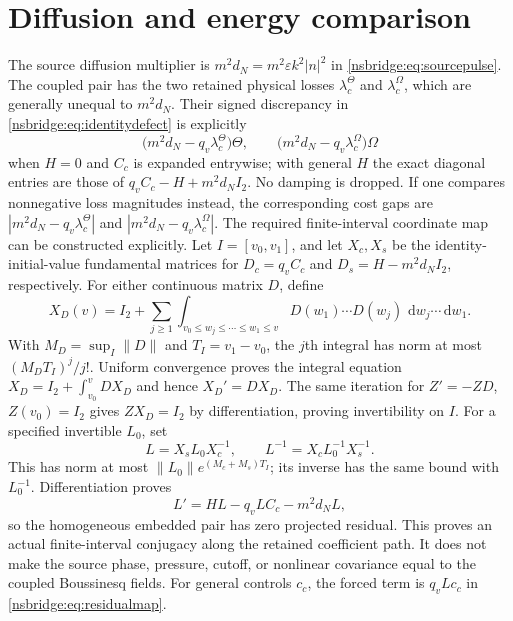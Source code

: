 \documentclass[11pt]{article}
\newcommand{\dd}{\,\mathrm d}
\begin{document}
\section{Diffusion and energy comparison}
The source diffusion multiplier is $m^2d_N=m^2\varepsilon k^2|n|^2$ in
\eqref{nsbridge:eq:sourcepulse}.  The coupled pair has the two retained physical losses
$\lambda_c^\Theta$ and $\lambda_c^\Omega$, which are generally unequal to
$m^2d_N$.  Their signed discrepancy in \eqref{nsbridge:eq:identitydefect} is explicitly
\begin{equation}
 \bigl(m^2d_N-q_v\lambda_c^\Theta\bigr)\Theta,
 \qquad
 \bigl(m^2d_N-q_v\lambda_c^\Omega\bigr)\Omega
\end{equation}
when $H=0$ and $C_c$ is expanded entrywise; with general $H$ the exact
diagonal entries are those of $q_vC_c-H+m^2d_NI_2$.  No damping is dropped.
If one compares nonnegative loss magnitudes instead, the corresponding cost
gaps are $|m^2d_N-q_v\lambda_c^\Theta|$ and
$|m^2d_N-q_v\lambda_c^\Omega|$.
The required finite-interval coordinate map can be constructed explicitly.
Let $I=[v_0,v_1]$, and let $X_c,X_s$ be the identity-initial-value
fundamental matrices for $D_c=q_vC_c$ and $D_s=H-m^2d_NI_2$,
respectively. For either continuous matrix $D$, define
\[
 X_D(v)=I_2+\sum_{j\ge1}
 \int_{v_0\le w_j\le\cdots\le w_1\le v}
 D(w_1)\cdots D(w_j)\,\dd w_j\cdots\dd w_1 .
\]
With $M_D=\sup_I\|D\|$ and $T_I=v_1-v_0$, the $j$th integral has norm
at most $(M_DT_I)^j/j!$. Uniform convergence proves the integral equation
$X_D=I_2+\int_{v_0}^vDX_D$ and hence $X_D'=DX_D$.
The same iteration for $Z'=-ZD$, $Z(v_0)=I_2$ gives $ZX_D=I_2$
by differentiation, proving invertibility on $I$. For a specified
invertible $L_0$, set
\[
 L=X_sL_0X_c^{-1},\qquad L^{-1}=X_cL_0^{-1}X_s^{-1}.
\]
This has norm at most $\|L_0\|e^{(M_c+M_s)T_I}$; its inverse has the
same bound with $L_0^{-1}$. Differentiation proves
\begin{equation}
 L'=HL-q_vLC_c-m^2d_NL,
 \label{nsbridge:eq:intertwiner}
\end{equation}
so the homogeneous embedded pair has zero projected residual. This proves
an actual finite-interval conjugacy along the retained coefficient path.
It does not make the source phase,
pressure, cutoff, or nonlinear covariance equal to the coupled Boussinesq fields.
For general controls $c_c$, the forced term is $q_vLc_c$ in
\eqref{nsbridge:eq:residualmap}.
\end{document}
